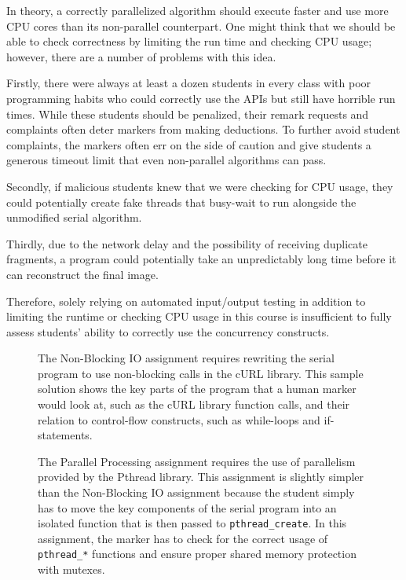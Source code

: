 In theory, a correctly parallelized algorithm should execute faster and use more CPU cores than its non-parallel counterpart. One might think that we should be able to check correctness by limiting the run time and checking CPU usage; however, there are a number of problems with this idea.

Firstly, there were always at least a dozen students in every class with poor programming habits who could correctly use the APIs but still have horrible run times. While these students should be penalized, their remark requests and complaints often deter markers from making deductions. To further avoid student complaints, the markers often err on the side of caution and give students a generous timeout limit that even non-parallel algorithms can pass.

Secondly, if malicious students knew that we were checking for CPU usage, they could potentially create fake threads that busy-wait to run alongside the unmodified serial algorithm.

Thirdly, due to the network delay and the possibility of receiving duplicate fragments, a program could potentially take an unpredictably long time before it can reconstruct the final image. 

Therefore, solely relying on automated input/output testing in addition to limiting the runtime or checking CPU usage in this course is insufficient to fully assess students' ability to correctly use the concurrency constructs.

\begin{figure}

\caption[Non-Blocking IO Assignment]{The Non-Blocking IO assignment requires rewriting the serial program to use non-blocking  calls in the cURL library. This sample solution shows the key parts of the program that a human marker would look at, such as the cURL library function calls, and their relation to control-flow constructs, such as while-loops and if-statements.}
\label{fig:intro-nonblockingio}
\end{figure}

\begin{figure}

\caption[Parallel Processing Assignment]{The Parallel Processing assignment requires the use of parallelism provided by the Pthread library. This assignment is slightly simpler than the Non-Blocking IO assignment because the student simply has to move the key components of the serial program into an isolated function that is then passed to \texttt{pthread\_create}. In this assignment, the marker has to check for the correct usage of \texttt{pthread\_*} functions and ensure proper shared memory protection with mutexes.}
\label{fig:intro-parallelprocessing}
\end{figure}


